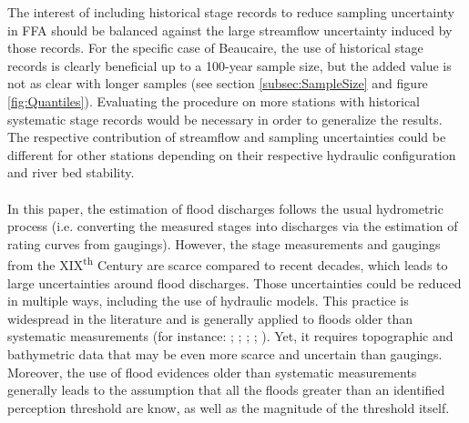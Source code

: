 \documentclass[11pt]{article}
\begin{document}
    The interest of including historical stage records to reduce sampling uncertainty in FFA should be balanced against the large streamflow uncertainty induced by those records. For the specific case of Beaucaire, the use of historical stage records is clearly beneficial up to a 100-year sample size, but the added value is not as clear with longer samples (see section \ref{subsec:SampleSize} and figure \ref{fig:Quantiles}). Evaluating the procedure on more stations with historical systematic stage records would be necessary in order to generalize the results. The respective contribution of streamflow and sampling uncertainties could be different for other stations depending on their respective hydraulic configuration and river bed stability.    
    \paragraph{}
    In this paper, the estimation of flood discharges follows the usual hydrometric process (i.e. converting the measured stages into discharges via the estimation of rating curves from gaugings). However, the stage measurements and gaugings from the XIX\textsuperscript{th} Century are scarce compared to recent decades, which leads to large uncertainties around flood discharges. Those uncertainties could be reduced in multiple ways, including the use of hydraulic models. This practice is widespread in the literature and is generally applied to floods older than systematic measurements (for instance: \citet{naulet_flood_2005}; \citet{neppel_flood_2010}; \citet{machado_flood_2015}; \citet{ruiz-bellet_uncertainty_2017}; \citet{van_der_meulen_late_2021}). Yet, it requires topographic and bathymetric data that may be even more scarce and uncertain than gaugings. Moreover, the use of flood evidences older than systematic measurements generally leads to the assumption that all the floods greater than an identified perception threshold are know, as well as the magnitude of the threshold itself.
    
\end{document}
